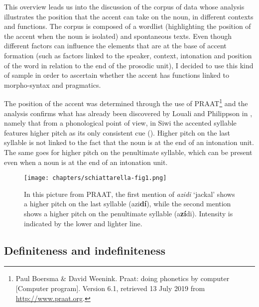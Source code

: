 \documentclass[output=paper]{langsci/langscibook}
\begin{document}
This overview leads us into the discussion of the corpus of data whose analysis illustrates the position that the accent can take on the noun, in different contexts and functions. The corpus is composed of a wordlist (highlighting the position of the accent when the noun is isolated) and spontaneous texts. Even though different factors can influence the elements that are at the base of accent formation (such as factors linked to the speaker, context, intonation and position of the word in relation to the end of the prosodic unit), I decided to use this kind of sample in order to ascertain whether the accent has functions linked to morpho-syntax and pragmatics.

The position of the accent was determined through the use of PRAAT\footnote{Paul Boersma \& David Weenink. Praat: doing phonetics by computer [Computer program]. Version 6.1, retrieved 13 July 2019 from \url{http://www.praat.org}.} and the analysis confirms what has already been discovered by Louali and Philippson in \citeyear{louali:philippson:04}, namely that from a phonological point of view, in Siwi the accented syllable features higher pitch as its only consistent cue (). Higher pitch on the last syllable is not linked to the fact that the noun is at the end of an intonation unit. The same goes for higher pitch on the penultimate syllable, which can be present even when a noun is at the end of an intonation unit.

\begin{figure}
\centering
\texttt{[image: chapters/schiattarella-fig1.png]}
\caption{In this picture from PRAAT, the first mention of {\emph{azidi}} `jackal' shows a higher pitch on the last syllable (azi{\textbf{dí}}), while the second mention shows a higher pitch on the penultimate syllable (a{\textbf{zí}}di). Intensity is indicated by the lower and lighter line.}\label{5fig:1}
\end{figure}


\subsection{Definiteness and indefiniteness}\label{5sec:14}
\end{document}
